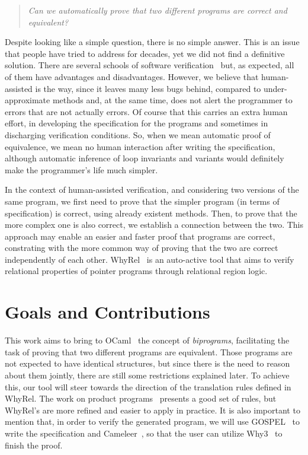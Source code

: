 \begin{quote}
    \centering
    \emph{Can we automatically prove that two different programs are correct and equivalent?}
\end{quote}

Despite looking like a simple question, there is no simple answer.
This is an issue that people have tried to address for decades, yet we did not find a definitive solution.
There are several schools of software verification~\cite{DBLP:conf/fm/BrainP24} but, as expected, all of them have advantages and disadvantages.
However, we believe that human-assisted is the way, since it leaves many less bugs behind, compared to under-approximate methods and, at the same time, does not alert the programmer to errors that are not actually errors.
Of course that this carries an extra human effort, in developing the specification for the programs and sometimes in discharging verification conditions.
So, when we mean automatic proof of equivalence, we mean no human interaction after writing the specification, although automatic inference of loop invariants and variants would definitely make the programmer's life much simpler.

In the context of human-assisted verification, and considering two versions of the same program, we first need to prove that the simpler program (in terms of specification) is correct, using already existent methods.
Then, to prove that the more complex one is also correct, we establish a connection between the two.
This approach may enable an easier and faster proof that programs are correct, constrating with the more common way of proving that the two are correct independently of each other. 
WhyRel~\cite{whyrel} is an auto-active tool that aims to verify relational properties of pointer programs through relational region logic.

\section{Goals and Contributions}

This work aims to bring to OCaml~\cite{ocaml} the concept of \emph{biprograms}, facilitating the task of proving that two different programs are equivalent.
Those programs are not expected to have identical structures, but since there is the need to reason about them jointly, there are still some restrictions explained later.
To achieve this, our tool will steer towards the direction of the translation rules defined in WhyRel.
The work on product programs~\cite{DBLP:conf/fm/BartheCK11} presents a good set of rules, but WhyRel's are more refined and easier to apply in practice.
It is also important to mention that, in order to verify the generated program, we will use GOSPEL~\cite{DBLP:conf/fm/ChargueraudFLP19} to write the specification and Cameleer~\cite{DBLP:conf/cav/PereiraR20}, so that the user can utilize Why3~\cite{why3} to finish the proof.

